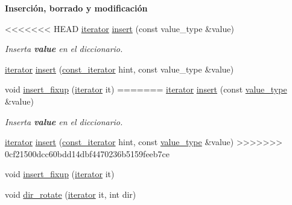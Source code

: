 \begin{Indent}\textbf{ Inserción, borrado y modificación}\par
\begin{DoxyCompactItemize}
\item 
<<<<<<< HEAD
\hyperlink{classaed2_1_1map_1_1iterator}{iterator} \hyperlink{classaed2_1_1map_a60aacba06b1579630b3c8e996cf248c8_a60aacba06b1579630b3c8e996cf248c8}{insert} (const value\-\_\-type \&value)
\begin{DoxyCompactList}\small\item\em \-Inserta {\bfseries value} en el diccionario. \end{DoxyCompactList}\item 
\hyperlink{classaed2_1_1map_1_1iterator}{iterator} \hyperlink{classaed2_1_1map_a6941cde9a79c27f054b5c97a587a1854_a6941cde9a79c27f054b5c97a587a1854}{insert} (\hyperlink{classaed2_1_1map_1_1const__iterator}{const\-\_\-iterator} hint, const value\-\_\-type \&value)
\item 
void \hyperlink{classaed2_1_1map_ac9197851fe5b217d45d58bbaf3612c75_ac9197851fe5b217d45d58bbaf3612c75}{insert\-\_\-fixup} (\hyperlink{classaed2_1_1map_1_1iterator}{iterator} it)
=======
\hyperlink{classaed2_1_1map_1_1iterator}{iterator} \hyperlink{classaed2_1_1map_a60aacba06b1579630b3c8e996cf248c8_a60aacba06b1579630b3c8e996cf248c8}{insert} (const \hyperlink{classaed2_1_1map_a719db98e0ff9a837610f76be33264680_a719db98e0ff9a837610f76be33264680}{value\+\_\+type} \&value)
\begin{DoxyCompactList}\small\item\em Inserta {\bfseries value} en el diccionario. \end{DoxyCompactList}\item 
\hyperlink{classaed2_1_1map_1_1iterator}{iterator} \hyperlink{classaed2_1_1map_a6941cde9a79c27f054b5c97a587a1854_a6941cde9a79c27f054b5c97a587a1854}{insert} (\hyperlink{classaed2_1_1map_1_1const__iterator}{const\+\_\+iterator} hint, const \hyperlink{classaed2_1_1map_a719db98e0ff9a837610f76be33264680_a719db98e0ff9a837610f76be33264680}{value\+\_\+type} \&value)
>>>>>>> 0cf21500dcc60bdd14dbf4470236b5159feeb7ce
\item 
void \hyperlink{classaed2_1_1map_ac9197851fe5b217d45d58bbaf3612c75_ac9197851fe5b217d45d58bbaf3612c75}{insert\+\_\+fixup} (\hyperlink{classaed2_1_1map_1_1iterator}{iterator} it)
\item 
void \hyperlink{classaed2_1_1map_a94f2862ada0c9ed4f4457eac42ea8f23_a94f2862ada0c9ed4f4457eac42ea8f23}{dir\+\_\+rotate} (\hyperlink{classaed2_1_1map_1_1iterator}{iterator} it, int dir)

\end{DoxyCompactItemize}
\end{Indent}
